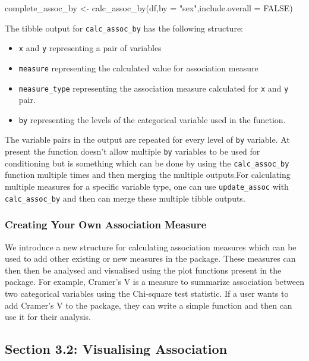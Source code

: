 \begin{Schunk}
\begin{Sinput}
complete_assoc_by <- calc_assoc_by(df,by = "sex",include.overall = FALSE)
\end{Sinput}
\end{Schunk}

The tibble output for \texttt{calc\_assoc\_by} has the following
structure:

\begin{itemize}
\tightlist
\item
  \texttt{x} and \texttt{y} representing a pair of variables
\item
  \texttt{measure} representing the calculated value for association
  measure
\item
  \texttt{measure\_type} representing the association measure calculated
  for \texttt{x} and \texttt{y} pair.
\item
  \texttt{by} representing the levels of the categorical variable used
  in the function.
\end{itemize}

The variable pairs in the output are repeated for every level of
\texttt{by} variable. At present the function doesn't allow multiple
\texttt{by} variables to be used for conditioning but is something which
can be done by using the \texttt{calc\_assoc\_by} function multiple
times and then merging the multiple outputs.For calculating multiple
measures for a specific variable type, one can use
\texttt{update\_assoc} with \texttt{calc\_assoc\_by} and then can merge
these multiple tibble outputs.

\hypertarget{creating-your-own-association-measure}{%
\subsubsection{Creating Your Own Association
Measure}\label{creating-your-own-association-measure}}

We introduce a new structure for calculating association measures which
can be used to add other existing or new measures in the package. These
measures can then then be analysed and visualised using the plot
functions present in the package. For example, Cramer's V is a measure
to summarize association between two categorical variables using the
Chi-square test statistic. If a user wants to add Cramer's V to the
package, they can write a simple function and then can use it for their
analysis.

\hypertarget{section-3.2-visualising-association}{%
\subsection{Section 3.2: Visualising
Association}\label{section-3.2-visualising-association}}

